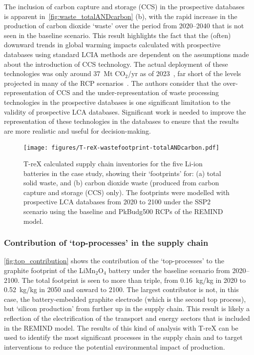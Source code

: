 \documentclass[a4paper,fleqn,longmktitle]{cas-dc}
\begin{document}
The inclusion of carbon capture and storage (CCS) in the prospective databases is apparent in~\autoref{fig:waste_totalANDcarbon} (b), with the rapid increase in the production of carbon dioxide `waste' over the period from 2020--2040 that is not seen in the baseline scenario. This result highlights the fact that the (often) downward trends in global warming impacts calculated with prospective databases using standard LCIA methods are dependent on the assumptions made about the introduction of CCS technology. The actual deployment of these technologies was only around 37~Mt CO$_2$/yr as of 2023~\citep{dziejarski2023ccs}, far short of the levels projected in many of the RCP scenarios~\citep{sacchi2023premisedocs}. The authors consider that the over-representation of CCS and the under-representation of waste processing technologies in the prospective databases is one significant limitation to the validity of prospective LCA databases. Significant work is needed to improve the representation of these technologies in the databases to ensure that the results are more realistic and useful for decision-making.

\begin{figure}[H]
    \centering
    \texttt{[image: figures/T-reX-wastefootprint-totalANDcarbon.pdf]}
    \caption{T-reX calculated supply chain inventories for the five Li-ion batteries in the case study, showing their `footprints' for: (a) total solid waste, and (b) carbon dioxide waste (produced from carbon capture and storage (CCS) only). The footprints were modelled with prospective LCA databases from 2020 to 2100 under the SSP2 scenario using the baseline and PkBudg500 RCPs of the REMIND model.}\label{fig:waste_totalANDcarbon}
\end{figure}

\subsubsection{Contribution of `top-processes' in the supply chain}%

\autoref{fig:top_contribution} shows the contribution of the `top-processes' to the graphite footprint of the  LiMn\(_2\)O\(_4\) battery under the baseline scenario from 2020--2100. The total footprint is seen to more than triple, from 0.16~kg/kg in 2020 to 0.52~kg/kg in 2050 and onward to 2100. The largest contributor is not, in this case, the battery-embedded graphite electrode (which is the second top process), but `silicon production' from further up in the supply chain. This result is likely a reflection of the electrification of the transport and energy sectors that is included in the REMIND model. The results of this kind of analysis with T-reX can be used to identify the most significant processes in the supply chain and to target interventions to reduce the potential environmental impact of production.
\end{document}
